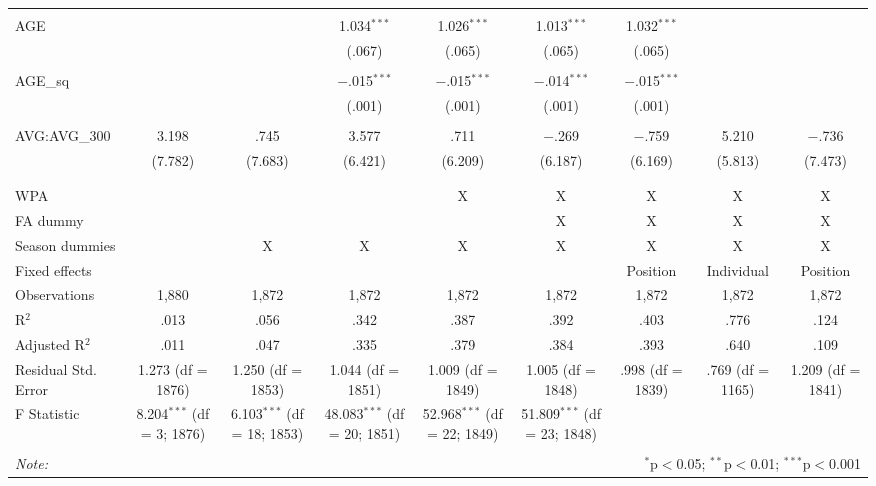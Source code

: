 \begin{table}[H]
\begin{tabular}{@{\extracolsep{5pt}}lcccccccc}
  & & & & & & & & \\
 AGE &  &  & 1.034$^{***}$ & 1.026$^{***}$ & 1.013$^{***}$ & 1.032$^{***}$ &  &  \\
  &  &  & (.067) & (.065) & (.065) & (.065) &  &  \\
  & & & & & & & & \\
 AGE\_sq &  &  & $-$.015$^{***}$ & $-$.015$^{***}$ & $-$.014$^{***}$ & $-$.015$^{***}$ &  &  \\
  &  &  & (.001) & (.001) & (.001) & (.001) &  &  \\
  & & & & & & & & \\
 AVG:AVG\_300 & 3.198 & .745 & 3.577 & .711 & $-$.269 & $-$.759 & 5.210 & $-$.736 \\
  & (7.782) & (7.683) & (6.421) & (6.209) & (6.187) & (6.169) & (5.813) & (7.473) \\
  & & & & & & & & \\
\hline \\[-1.8ex]
WPA &  &  &  & X & X & X & X & X \\
FA dummy &  &  &  &  & X & X & X & X \\
Season dummies &  & X & X & X & X & X & X & X \\
Fixed effects &  &  &  &  &  & Position & Individual & Position \\
Observations & 1,880 & 1,872 & 1,872 & 1,872 & 1,872 & 1,872 & 1,872 & 1,872 \\
R$^{2}$ & .013 & .056 & .342 & .387 & .392 & .403 & .776 & .124 \\
Adjusted R$^{2}$ & .011 & .047 & .335 & .379 & .384 & .393 & .640 & .109 \\
Residual Std. Error & 1.273 (df = 1876) & 1.250 (df = 1853) & 1.044 (df = 1851) & 1.009 (df = 1849) & 1.005 (df = 1848) & .998 (df = 1839) & .769 (df = 1165) & 1.209 (df = 1841) \\
F Statistic & 8.204$^{***}$ (df = 3; 1876) & 6.103$^{***}$ (df = 18; 1853) & 48.083$^{***}$ (df = 20; 1851) & 52.968$^{***}$ (df = 22; 1849) & 51.809$^{***}$ (df = 23; 1848) &  &  &  \\
\hline
\hline \\[-1.8ex]
\textit{Note:}  & \multicolumn{8}{r}{$^{*}$p$<$0.05; $^{**}$p$<$0.01; $^{***}$p$<$0.001} \\
\end{tabular}
\end{table}
